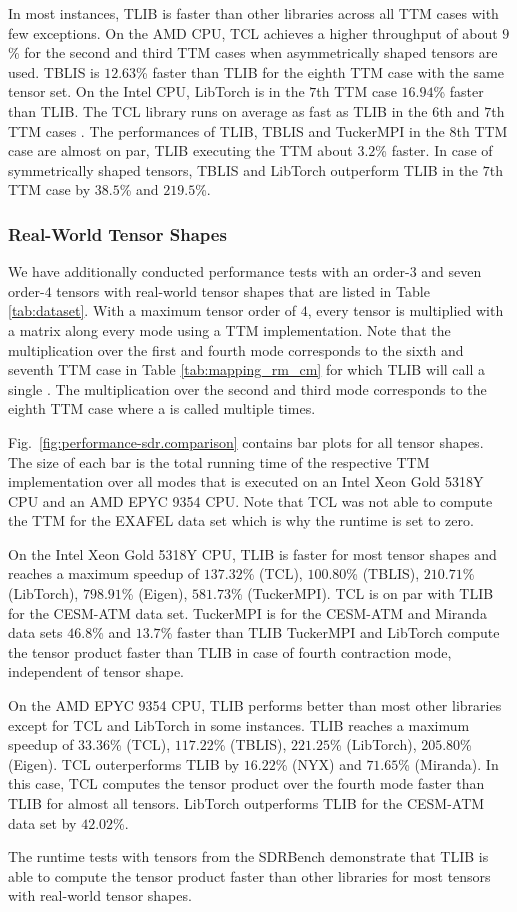 In most instances, TLIB is faster than other libraries across all TTM cases with few exceptions.
On the AMD CPU, TCL achieves a higher throughput of about $9$\% for the second and third TTM cases when asymmetrically shaped tensors are used.
TBLIS is $12.63$\% faster than TLIB for the eighth TTM case with the same tensor set.
On the Intel CPU, LibTorch is in the $7$th TTM case $16.94$\% faster than TLIB.
The TCL library runs on average as fast as TLIB in the $6$th and $7$th TTM cases .
The performances of TLIB, TBLIS and TuckerMPI in the $8$th TTM case are almost on par, TLIB executing the TTM about $3.2$\% faster.
In case of symmetrically shaped tensors, TBLIS and LibTorch outperform TLIB in the $7$th TTM case by $38.5$\% and $219.5$\%.


\subsubsection{Real-World Tensor Shapes}
We have additionally conducted performance tests with an order-$3$ and seven order-$4$ tensors with real-world tensor shapes that are listed in Table \ref{tab:dataset}.
With a maximum tensor order of $4$, every tensor is multiplied with a matrix along every mode using a TTM implementation.
Note that the multiplication over the first and fourth mode corresponds to the sixth and seventh TTM case in Table \ref{tab:mapping_rm_cm} for which TLIB will call a single .
The multiplication over the second and third mode corresponds to the eighth TTM case where a  is called multiple times.

Fig.~\ref{fig:performance-sdr.comparison} contains bar plots for all tensor shapes.
The size of each bar is the total running time of the respective TTM implementation over all modes that is executed on an Intel Xeon Gold 5318Y CPU and an AMD EPYC 9354 CPU.
Note that TCL was not able to compute the TTM for the EXAFEL data set which is why the runtime is set to zero.

On the Intel Xeon Gold 5318Y CPU, TLIB is faster for most tensor shapes and reaches a maximum speedup of $137.32$\% (TCL), $100.80$\% (TBLIS), $210.71$\% (LibTorch), $798.91$\% (Eigen), $581.73$\% (TuckerMPI).
TCL is on par with TLIB for the CESM-ATM data set.
TuckerMPI is for the CESM-ATM and Miranda data sets $46.8$\% and $13.7$\% faster than TLIB 
TuckerMPI and LibTorch compute the tensor product faster than TLIB in case of fourth contraction mode, independent of tensor shape.

On the AMD EPYC 9354 CPU, TLIB performs better than most other libraries except for TCL and LibTorch in some instances.
TLIB reaches a maximum speedup of $33.36$\% (TCL), $117.22$\% (TBLIS), $221.25$\% (LibTorch), $205.80$\% (Eigen).
TCL outerperforms TLIB by $16.22$\% (NYX) and $71.65$\% (Miranda).
In this case, TCL computes the tensor product over the fourth mode faster than TLIB for almost all tensors.
LibTorch outperforms TLIB for the CESM-ATM data set by $42.02$\%.

The runtime tests with tensors from the SDRBench demonstrate that TLIB is able to compute the tensor product faster than other libraries for most tensors with real-world tensor shapes.

